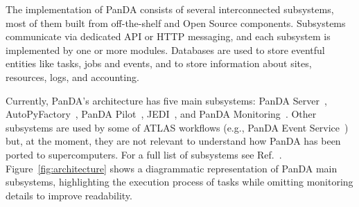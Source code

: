 The implementation of PanDA consists of several interconnected subsystems, most
of them built from off-the-shelf and Open Source components. Subsystems
communicate via dedicated API or HTTP messaging, and each subsystem is
implemented by one or more modules. Databases are used to store eventful
entities like tasks, jobs and events, and to store information about sites,
resources, logs, and accounting.

Currently, PanDA's architecture has five main subsystems: PanDA
Server~\cite{maeno2011overview},
AutoPyFactory~\cite{caballero2012autopyfactory}, PanDA
Pilot~\cite{nilsson2011atlas}, JEDI~\cite{borodin2015scaling}, and PanDA
Monitoring~\cite{klimentov2011atlas}. Other subsystems are used by some of ATLAS
workflows (e.g., PanDA Event Service~\cite{calafiura2015atlas}) but, at the
moment, they are not relevant to understand how PanDA has been ported to
supercomputers. For a full list of subsystems see Ref.~\cite{panda-wiki_url}.
Figure~\ref{fig:architecture} shows a diagrammatic representation of PanDA main
subsystems, highlighting the execution process of tasks while omitting
monitoring details to improve readability.

